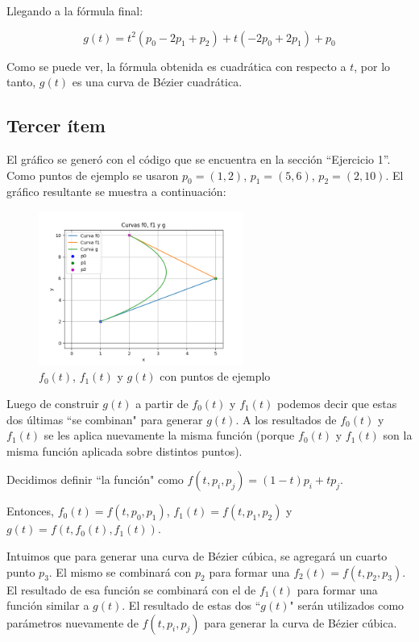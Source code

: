 \documentclass{article}
\begin{document}
Llegando a la fórmula final:

$$
g(t) = t^2 (p_0 - 2 p_1 + p_2) + t (-2 p_0 + 2 p_1) + p_0
$$

Como se puede ver, la fórmula obtenida es cuadrática con respecto a $t$, por lo tanto, $g(t)$ es una curva de Bézier cuadrática.
\subsection*{Tercer ítem}
El gráfico se generó con el código que se encuentra en la sección ``Ejercicio 1''. Como puntos de ejemplo se usaron $p_0 = (1, 2)$, $p_1 = (5, 6)$, $p_2 = (2, 10)$. El gráfico resultante se muestra  a continuación:

\begin{figure}[H]
    \centering
    \includegraphics[width=0.6\textwidth]{imagenes/graf_ej1.png}
    \caption{$f_0(t)$, $f_1(t)$ y $g(t)$ con puntos de ejemplo}
    \label{fig:ejemplo}
\end{figure}

Luego de construir $g(t)$ a partir de $f_0(t)$ y $f_1(t)$ podemos decir que estas dos últimas ``se combinan" para generar  $g(t)$. A los resultados de $f_0(t)$ y $f_1(t)$ se les aplica nuevamente la misma función (porque $f_0(t)$ y $f_1(t)$ son la misma función aplicada sobre distintos puntos).

Decidimos definir ``la función" como $f(t, p_i, p_j) = (1-t) p_i + t p_j$.

Entonces, $f_0(t) = f(t, p_0, p_1)$, $f_1(t) = f(t, p_1, p_2)$ y $g(t) = f(t, f_0(t), f_1(t))$.

Intuimos que para generar una curva de Bézier cúbica, se agregará un cuarto punto $p_3$. El mismo se combinará con $p_2$ para formar una $f_2(t) = f(t, p_2, p_3)$. El resultado de esa función se combinará con el de $f_1(t)$ para formar una función similar a $g(t)$. El resultado de estas dos ``$g(t)$" serán utilizados como parámetros nuevamente de $f(t, p_i, p_j)$ para generar la curva de Bézier cúbica.
\end{document}
